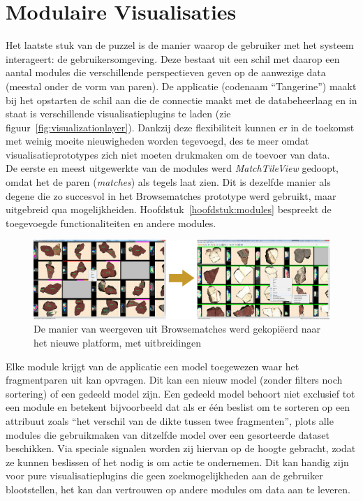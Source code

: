 \section{Modulaire Visualisaties}
Het laatste stuk van de puzzel is de manier waarop de gebruiker met het systeem interageert: de gebruikersomgeving. Deze bestaat uit een schil met daarop een aantal modules die verschillende perspectieven geven op de aanwezige data (meestal onder de vorm van paren). De applicatie (codenaam ``Tangerine'') maakt bij het opstarten de schil aan die de connectie maakt met de databeheerlaag en in staat is verschillende visualisatieplugins te laden (zie figuur~\ref{fig:visualizationlayer}). Dankzij deze flexibiliteit kunnen er in de toekomst met weinig moeite nieuwigheden worden tegevoegd, des te meer omdat visualisatieprototypes zich niet moeten drukmaken om de toevoer van data.\\

De eerste en meest uitgewerkte van de modules werd \emph{MatchTileView} gedoopt, omdat het de paren (\emph{matches}) als tegels laat zien. Dit is dezelfde manier als degene die zo succesvol in het Browsematches prototype werd gebruikt, maar uitgebreid qua mogelijkheiden. Hoofdstuk~\ref{hoofdstuk:modules} bespreekt de toegevoegde functionaliteiten en andere modules.\\

\begin{figure}[ht]
	\begin{center}
		\includegraphics[width=1.0\columnwidth]{images/browsematches-to-tangerine-01.png}
		\caption{De manier van weergeven uit Browsematches werd gekopi\"eerd naar het nieuwe platform, met uitbreidingen}
		\label{fig:browsematchestotang}
	\end{center}
\end{figure}

Elke module krijgt van de applicatie een model toegewezen waar het fragmentparen uit kan opvragen. Dit kan een nieuw model (zonder filters noch sortering) of een gedeeld model zijn. Een gedeeld model behoort niet exclusief tot een module en betekent bijvoorbeeld dat als er \'e\'en beslist om te sorteren op een attribuut zoals ``het verschil van de dikte tussen twee fragmenten'', plots alle modules die gebruikmaken van ditzelfde model over een gesorteerde dataset beschikken. Via speciale signalen worden zij hiervan op de hoogte gebracht, zodat ze kunnen beslissen of het nodig is om actie te ondernemen. Dit kan handig zijn voor pure visualisatieplugins die geen zoekmogelijkheden aan de gebruiker blootstellen, het kan dan vertrouwen op andere modules om data aan te leveren.\\

